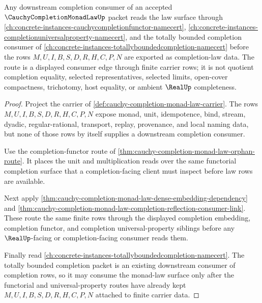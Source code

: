 \begin{theorem}
\label{thm:cauchy-completion-monad-law-downstream-completion-consumer}
Any downstream completion consumer of an accepted $\CauchyCompletionMonadLawUp$ packet reads the law surface through \autoref{ch:concrete-instances-cauchycompletionfunctor-namecert}, \autoref{ch:concrete-instances-completionuniversalproperty-namecert}, and the totally bounded completion consumer of \autoref{ch:concrete-instances-totallyboundedcompletion-namecert} before the rows $M,U,I,B,S,D,R,H,C,P,N$ are exported as completion-law data. The route is a displayed consumer edge through finite carrier rows; it is not quotient completion equality, selected representatives, selected limits, open-cover compactness, trichotomy, host equality, or ambient $\RealUp$ completeness.
\end{theorem}
\begin{proof}
Project the carrier of \autoref{def:cauchy-completion-monad-law-carrier}. The rows $M,U,I,B,S,D,R,H,C,P,N$ expose monad, unit, idempotence, bind, stream, dyadic, regular-rational, transport, replay, provenance, and local naming data, but none of those rows by itself supplies a downstream completion consumer.

Use the completion-functor route of \autoref{thm:cauchy-completion-monad-law-orphan-route}. It places the unit and multiplication reads over the same functorial completion surface that a completion-facing client must inspect before law rows are available.

Next apply \autoref{thm:cauchy-completion-monad-law-dense-embedding-dependency} and \autoref{thm:cauchy-completion-monad-law-completion-reflection-consumer-link}. These route the same finite rows through the displayed completion embedding, completion functor, and completion universal-property siblings before any $\RealUp$-facing or completion-facing consumer reads them.

Finally read \autoref{ch:concrete-instances-totallyboundedcompletion-namecert}. The totally bounded completion packet is an existing downstream consumer of completion rows, so it may consume the monad-law surface only after the functorial and universal-property routes have already kept $M,U,I,B,S,D,R,H,C,P,N$ attached to finite carrier data.
\end{proof}

